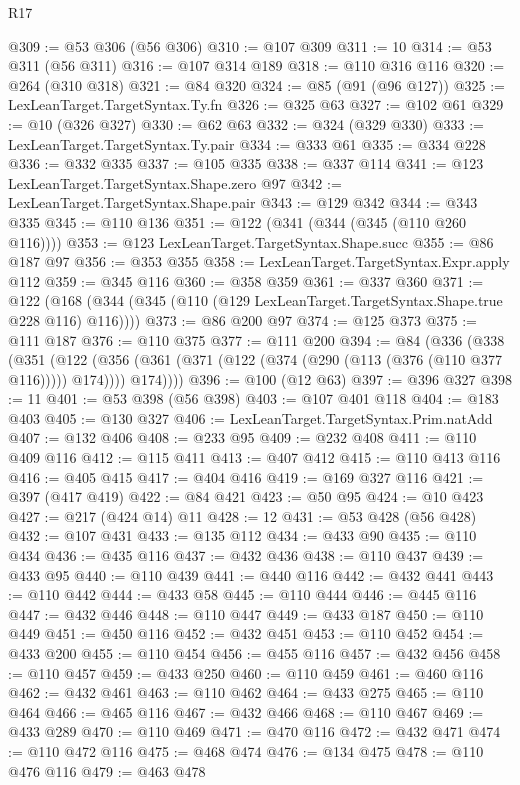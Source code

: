 \begin{lexlean}{R17}
\begin{coremodule}
@309 := @53 @306 (@56 @306)
@310 := @107 @309
@311 := 10
@314 := @53 @311 (@56 @311)
@316 := @107 @314 @189
@318 := @110 @316 @116
@320 := @264 (@310 @318)
@321 := @84 @320
@324 := @85 (@91 (@96 @127))
@325 := LexLeanTarget.TargetSyntax.Ty.fn
@326 := @325 @63
@327 := @102 @61
@329 := @10 (@326 @327)
@330 := @62 @63
@332 := @324 (@329 @330)
@333 := LexLeanTarget.TargetSyntax.Ty.pair
@334 := @333 @61
@335 := @334 @228
@336 := @332 @335
@337 := @105 @335
@338 := @337 @114
@341 := @123 LexLeanTarget.TargetSyntax.Shape.zero @97
@342 := LexLeanTarget.TargetSyntax.Shape.pair
@343 := @129 @342
@344 := @343 @335
@345 := @110 @136
@351 := @122 (@341 (@344 (@345 (@110 @260 @116))))
@353 := @123 LexLeanTarget.TargetSyntax.Shape.succ
@355 := @86 @187 @97
@356 := @353 @355
@358 := LexLeanTarget.TargetSyntax.Expr.apply @112
@359 := @345 @116
@360 := @358 @359
@361 := @337 @360
@371 := @122 (@168 (@344 (@345 (@110 (@129 LexLeanTarget.TargetSyntax.Shape.true @228 @116) @116))))
@373 := @86 @200 @97
@374 := @125 @373
@375 := @111 @187
@376 := @110 @375
@377 := @111 @200
@394 := @84
    (@336
      (@338
        (@351
          (@122
            (@356 (@361 (@371 (@122 (@374 (@290 (@113 (@376 (@110 @377 @116))))) @174))))
            @174))))
@396 := @100 (@12 @63)
@397 := @396 @327
@398 := 11
@401 := @53 @398 (@56 @398)
@403 := @107 @401 @118
@404 := @183 @403
@405 := @130 @327
@406 := LexLeanTarget.TargetSyntax.Prim.natAdd
@407 := @132 @406
@408 := @233 @95
@409 := @232 @408
@411 := @110 @409 @116
@412 := @115 @411
@413 := @407 @412
@415 := @110 @413 @116
@416 := @405 @415
@417 := @404 @416
@419 := @169 @327 @116
@421 := @397 (@417 @419)
@422 := @84 @421
@423 := @50 @95
@424 := @10 @423
@427 := @217 (@424 @14) @11
@428 := 12
@431 := @53 @428 (@56 @428)
@432 := @107 @431
@433 := @135 @112
@434 := @433 @90
@435 := @110 @434
@436 := @435 @116
@437 := @432 @436
@438 := @110 @437
@439 := @433 @95
@440 := @110 @439
@441 := @440 @116
@442 := @432 @441
@443 := @110 @442
@444 := @433 @58
@445 := @110 @444
@446 := @445 @116
@447 := @432 @446
@448 := @110 @447
@449 := @433 @187
@450 := @110 @449
@451 := @450 @116
@452 := @432 @451
@453 := @110 @452
@454 := @433 @200
@455 := @110 @454
@456 := @455 @116
@457 := @432 @456
@458 := @110 @457
@459 := @433 @250
@460 := @110 @459
@461 := @460 @116
@462 := @432 @461
@463 := @110 @462
@464 := @433 @275
@465 := @110 @464
@466 := @465 @116
@467 := @432 @466
@468 := @110 @467
@469 := @433 @289
@470 := @110 @469
@471 := @470 @116
@472 := @432 @471
@474 := @110 @472 @116
@475 := @468 @474
@476 := @134 @475
@478 := @110 @476 @116
@479 := @463 @478

\end{coremodule}
\end{lexlean}
